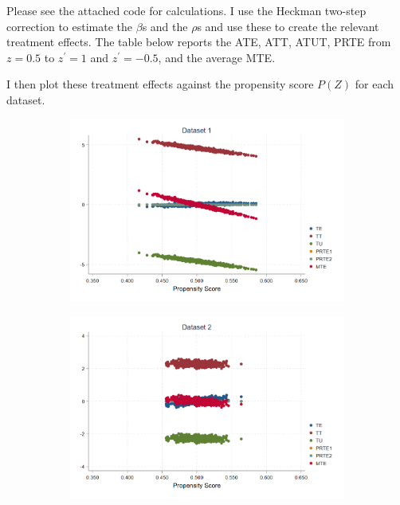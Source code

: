 \documentclass{article}
\begin{document}
\begin{solution}
Please see the attached code for calculations. I use the Heckman two-step correction to estimate the $\beta$s and the $\rho$s and use these to create the relevant treatment effects. The table below reports the ATE, ATT, ATUT, PRTE from $z=0.5$ to $z^\prime=1$ and $z^\prime=-0.5$, and the average MTE.
\begin{table}[H]
    \centering
    
\end{table}

I then plot these treatment effects against the propensity score $P(Z)$ for each dataset.

\begin{figure}[H]
    \centering
    \caption{$P(D=1|X)$ for each of the five datasets}
    \begin{subfigure}[b]{0.43\textwidth}
        \centering
        \includegraphics[width=\textwidth]{ps2Heckman/figures/q8_partb_d1_all.png}
    \end{subfigure}
    \begin{subfigure}[b]{0.43\textwidth}
        \centering
        \includegraphics[width=\textwidth]{ps2Heckman/figures/q8_partb_d2_all.png}

\end{subfigure}
\end{figure}
\end{solution}
\end{document}
